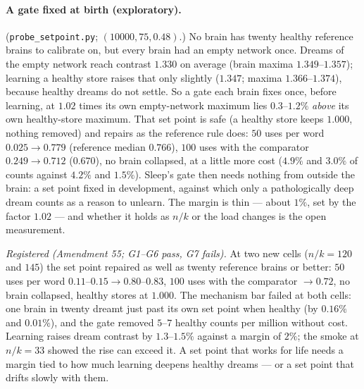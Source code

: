 \documentclass[11pt]{article}
\theoremstyle{definition}
\theoremstyle{plain}
\begin{document}
\paragraph{A gate fixed at birth (exploratory).} (\texttt{probe\_setpoint.py};
$(10000,75,0.48)$.) No brain has twenty healthy reference brains to calibrate
on, but every brain had an empty network once. Dreams of the empty network reach
contrast $1.330$ on average (brain maxima $1.349$--$1.357$); learning a healthy store
raises that only slightly ($1.347$; maxima $1.366$--$1.374$), because healthy
dreams do not settle. So a gate each brain fixes once, before learning, at
$1.02$ times its own empty-network maximum lies $0.3$--$1.2\%$ \emph{above} its own
healthy-store maximum. That set point is safe (a healthy store keeps $1.000$,
nothing removed) and repairs as the reference rule does: $50$ uses per word
$0.025 \to 0.779$ (reference median $0.766$), $100$ uses with the comparator
$0.249 \to 0.712$ ($0.670$), no brain collapsed, at a little more cost ($4.9\%$ and
$3.0\%$ of counts against $4.2\%$ and $1.5\%$). Sleep's gate then needs nothing from
outside the brain: a set point fixed in development, against which only a
pathologically deep dream counts as a reason to unlearn. The margin is thin ---
about $1\%$, set by the factor $1.02$ --- and whether it holds as $n/k$ or the load
changes is the open measurement.

\emph{Registered (Amendment 55; G1--G6 pass, G7 fails).} At two new cells
($n/k = 120$ and $145$) the set point repaired as well as twenty reference brains
or better: $50$ uses per word $0.11$--$0.15 \to 0.80$--$0.83$, $100$ uses with the
comparator $\to 0.72$, no brain collapsed, healthy stores at $1.000$. The
mechanism bar failed at both cells: one brain in twenty dreamt just past its own
set point when healthy (by $0.16\%$ and $0.01\%$), and the gate removed $5$--$7$
healthy counts per million without cost. Learning raises dream contrast by
$1.3$--$1.5\%$ against a margin of $2\%$; the smoke at $n/k = 33$ showed the rise can
exceed it. A set point that works for life needs a margin tied to how much
learning deepens healthy dreams --- or a set point that drifts slowly with them.
\end{document}
